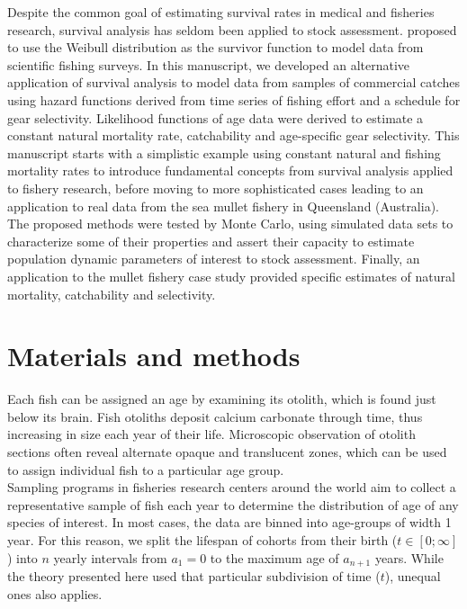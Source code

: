 \documentclass[12pt]{article}
\begin{document}
Despite the common goal of estimating survival rates in medical and fisheries research, survival analysis has seldom been applied to stock assessment. \cite{scimar42} proposed to use the Weibull distribution as the survivor function to model data from scientific fishing surveys. In this manuscript, we developed an alternative application of survival analysis to model data from samples of commercial catches using hazard functions derived from time series of fishing effort and a schedule for gear selectivity. Likelihood functions of age data were derived to estimate a constant natural mortality rate, catchability and age-specific gear selectivity. This manuscript starts with a simplistic example using constant natural and fishing mortality rates to introduce fundamental concepts from survival analysis applied to fishery research, before moving to more sophisticated cases leading to an application to real data from the sea mullet fishery in Queensland (Australia). The proposed methods were tested by Monte Carlo, using simulated data sets to characterize some of their properties and assert their capacity to estimate population dynamic parameters of interest to stock assessment. Finally, an application to the mullet fishery case study provided specific estimates of natural mortality, catchability and selectivity. \\

\section{Materials and methods} 

Each fish can be assigned an age by examining its otolith, which is found just below its brain. Fish otoliths deposit calcium carbonate through time, thus increasing in size each year of their life. Microscopic observation of otolith sections often reveal alternate opaque and translucent zones, which can be used to assign individual fish to a particular age group. \\ 

Sampling programs in fisheries research centers around the world aim to collect a representative sample of fish each year to determine the distribution of age of any species of interest. In most cases, the data are binned into age-groups of width 1 year. For this reason, we split the lifespan of cohorts from their birth ($t \in [0;\infty]$) into $n$ yearly intervals from $a_{1}=0$ to the maximum age of $a_{n+1}$ years. While the theory presented here used that particular subdivision of time ($t$), unequal ones also applies. %
 
\end{document}

